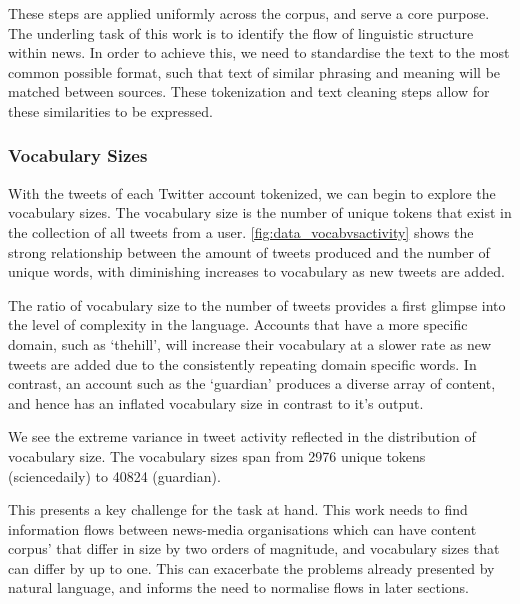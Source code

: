 These steps are applied uniformly across the corpus, and serve a core purpose. The underling task of this work is to identify the flow of linguistic structure within news. In order to achieve this, we need to standardise the text to the most common possible format, such that text of similar phrasing and meaning will be matched between sources. These tokenization and text cleaning steps allow for these similarities to be expressed.


\subsubsection{Vocabulary Sizes}\label{sec:vocabsizes}

With the tweets of each Twitter account tokenized, we can begin to explore the vocabulary sizes. The vocabulary size is the number of unique tokens that exist in the collection of all tweets from a user. \autoref{fig:data_vocabvsactivity} shows the strong relationship between the amount of tweets produced and the number of unique words, with diminishing increases to vocabulary as new tweets are added.

The ratio of vocabulary size to the number of tweets provides a first glimpse into the level of complexity in the language. Accounts that have a more specific domain, such as `thehill', will increase their vocabulary at a slower rate as new tweets are added due to the consistently repeating domain specific words. In contrast, an account such as the `guardian' produces a diverse array of content, and hence has an inflated vocabulary size in contrast to it's output.

We see the extreme variance in tweet activity reflected in the distribution of vocabulary size. The vocabulary sizes span from 2976 unique tokens (sciencedaily) to 40824 (guardian). 

This presents a key challenge for the task at hand. This work needs to find information flows between news-media organisations which can have content corpus' that differ in size by two orders of magnitude, and vocabulary sizes that can differ by up to one. This can exacerbate the problems already presented by natural language, and informs the need to normalise flows in later sections.


